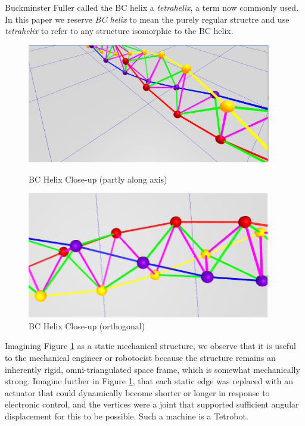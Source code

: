 \documentclass[11pt]{article}
\begin{document}
Buckminster Fuller called the BC helix a \emph{tetrahelix}\cite{fuller1982synergetics},
a term now commonly used. In this paper we reserve \emph{BC helix} to mean the purely regular structre and use \emph{tetrahelix} to refer
to any structure isomorphic to the BC helix.



\begin{figure}[H]
  \centering
     \includegraphics[width=0.95\textwidth]{figures/BCHelixCloseUp.png}
     \caption{BC Helix Close-up (partly along axis)}
  \centering
     \includegraphics[width=0.95\textwidth]{figures/VerticalCloseUp.png}
     \caption{BC Helix Close-up (orthogonal)}
  \label{fig:closeup}
\end{figure}



Imagining Figure \ref{fig:closeup} as a static mechanical structure,
we observe that it is useful to the mechanical engineer or
robotocist because the structure remains an inherently rigid,
omni-triangulated space frame, which is
somewhat mechanically strong.
Imagine further in Figure \ref{fig:closeup}, that each static edge was replaced with an
actuator that could dynamically become shorter or longer in response to electronic control,
and the vertices were a joint that supported sufficient angular displacement
for this to be possible. Such a machine is a Tetrobot\cite{TetrobotBook}.
\end{document}
